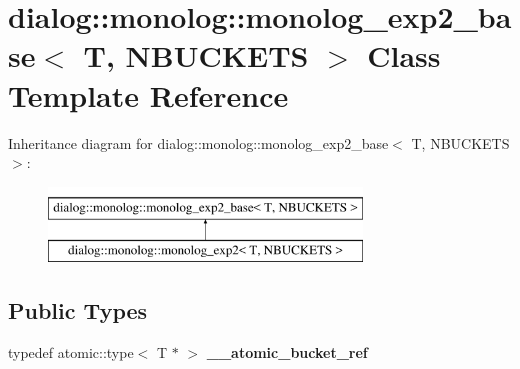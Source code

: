 \hypertarget{classdialog_1_1monolog_1_1monolog__exp2__base}{}\section{dialog\+:\+:monolog\+:\+:monolog\+\_\+exp2\+\_\+base$<$ T, N\+B\+U\+C\+K\+E\+TS $>$ Class Template Reference}
\label{classdialog_1_1monolog_1_1monolog__exp2__base}
Inheritance diagram for dialog\+:\+:monolog\+:\+:monolog\+\_\+exp2\+\_\+base$<$ T, N\+B\+U\+C\+K\+E\+TS $>$\+:\begin{figure}[H]
\begin{center}
\leavevmode
\includegraphics[height=2.000000cm]{classdialog_1_1monolog_1_1monolog__exp2__base}
\end{center}
\end{figure}
\subsection*{Public Types}
\begin{DoxyCompactItemize}
\item 
\mbox{\label{classdialog_1_1monolog_1_1monolog__exp2__base_a58f02a832fcddb4ead166f769ad40a85}} 
typedef atomic\+::type$<$ T $\ast$ $>$ {\bfseries \+\_\+\+\_\+atomic\+\_\+bucket\+\_\+ref}
\end{DoxyCompactItemize}
